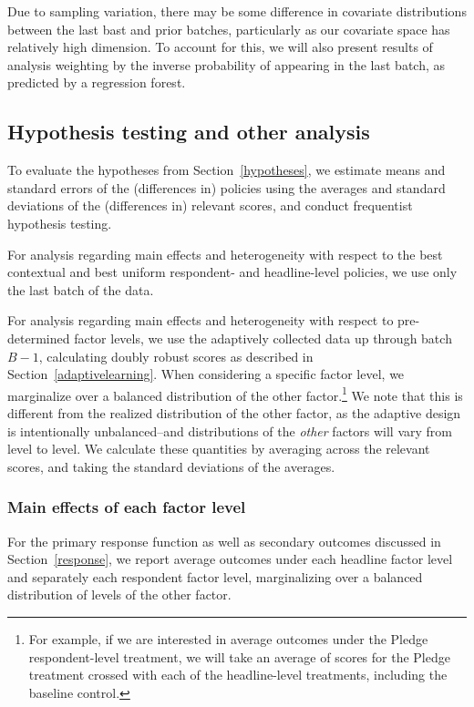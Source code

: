 \documentclass[letterpaper, 12pt, parskip=full,DIV=10]{scrartcl}
\begin{document}
Due to sampling variation, there may be some difference in covariate distributions between the last bast and prior batches, particularly as our covariate space has relatively high dimension. To account for this, we will also present results of analysis weighting by the inverse probability of appearing in the last batch, as predicted by a regression forest.


\subsection{Hypothesis testing and other analysis}
To evaluate the hypotheses from Section~\ref{hypotheses}, we estimate means and standard errors of the (differences in) policies using the averages and standard deviations of the (differences in) relevant scores, and conduct frequentist hypothesis testing. 

For analysis regarding main effects and heterogeneity with respect to the best contextual and best uniform respondent- and headline-level policies, we use only the last batch of the data. %

For analysis regarding main effects and heterogeneity with respect to pre-determined factor levels, we use the adaptively collected data up through batch $B-1$, calculating doubly robust scores as described in Section~\ref{adaptivelearning}. When considering a specific factor level, we marginalize over a balanced distribution of the other factor.\footnote{For example, if we are interested in average outcomes under the Pledge respondent-level treatment, we will take an average of scores for the Pledge treatment crossed with each of the headline-level treatments, including the baseline control.} %
We note that this is different from the realized distribution of the other factor, as the adaptive design is intentionally unbalanced--and distributions of the \textit{other} factors will vary from level to level. We calculate these quantities by averaging across the relevant scores, and taking the standard deviations of the averages. 

\subsubsection{Main effects of each factor level}\label{main}
For the primary response function as well as secondary outcomes discussed in Section~\ref{response}, we report average outcomes under each headline factor level and separately each respondent factor level, marginalizing over a balanced distribution of levels of the other factor.
\end{document}
